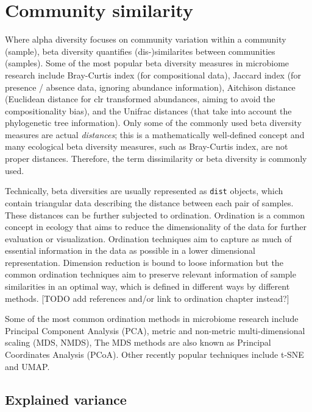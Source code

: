 \documentclass[
]{book}
\begin{document}
\hypertarget{community-similarity}{%
\chapter{Community similarity}\label{community-similarity}}

Where alpha diversity focuses on community variation within a
community (sample), beta diversity quantifies (dis-)similarites
between communities (samples). Some of the most popular beta diversity
measures in microbiome research include Bray-Curtis index (for
compositional data), Jaccard index (for presence / absence data,
ignoring abundance information), Aitchison distance (Euclidean
distance for clr transformed abundances, aiming to avoid the
compositionality bias), and the Unifrac distances (that take into
account the phylogenetic tree information). Only some of the commonly
used beta diversity measures are actual \emph{distances}; this is a
mathematically well-defined concept and many ecological beta diversity
measures, such as Bray-Curtis index, are not proper distances.
Therefore, the term dissimilarity or beta diversity is commonly used.

Technically, beta diversities are usually represented as \texttt{dist}
objects, which contain triangular data describing the distance between
each pair of samples. These distances can be further subjected to
ordination. Ordination is a common concept in ecology that aims to
reduce the dimensionality of the data for further evaluation or
visualization. Ordination techniques aim to capture as much of
essential information in the data as possible in a lower dimensional
representation. Dimension reduction is bound to loose information but
the common ordination techniques aim to preserve relevant information
of sample similarities in an optimal way, which is defined in
different ways by different methods. {[}TODO add references and/or link
to ordination chapter instead?{]}

Some of the most common ordination methods in microbiome research
include Principal Component Analysis (PCA), metric and non-metric
multi-dimensional scaling (MDS, NMDS), The MDS methods are also known
as Principal Coordinates Analysis (PCoA). Other recently popular
techniques include t-SNE and UMAP.

\hypertarget{explained-variance}{%
\section{Explained variance}\label{explained-variance}}
\end{document}
